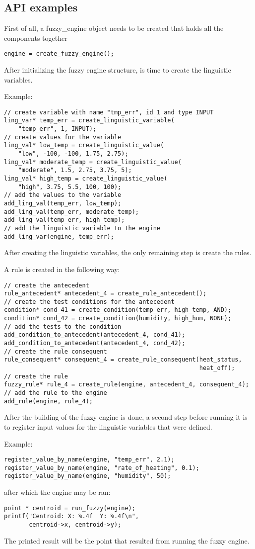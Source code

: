 \subsection{API examples}

\qquad First of all, a fuzzy_engine object needs to be created that holds all the components together
\begin{lstlisting}[frame=single]
engine = create_fuzzy_engine();
\end{lstlisting}

\qquad After initializing the fuzzy engine structure, is time to create the linguistic variables. \par
Example:
\lstset{language=C}
\begin{lstlisting}[frame=single]
// create variable with name "tmp_err", id 1 and type INPUT
ling_var* temp_err = create_linguistic_variable(
    "temp_err", 1, INPUT);
// create values for the variable
ling_val* low_temp = create_linguistic_value(
    "low", -100, -100, 1.75, 2.75);
ling_val* moderate_temp = create_linguistic_value(
    "moderate", 1.5, 2.75, 3.75, 5);
ling_val* high_temp = create_linguistic_value(
    "high", 3.75, 5.5, 100, 100);
// add the values to the variable
add_ling_val(temp_err, low_temp);
add_ling_val(temp_err, moderate_temp);
add_ling_val(temp_err, high_temp);
// add the linguistic variable to the engine
add_ling_var(engine, temp_err);
\end{lstlisting}

\qquad After creating the linguistic variables, the only remaining step is create the rules. \par
A rule is created in the following way:
\begin{lstlisting}[frame=single]
// create the antecedent
rule_antecedent* antecedent_4 = create_rule_antecedent();
// create the test conditions for the antecedent
condition* cond_41 = create_condition(temp_err, high_temp, AND);
condition* cond_42 = create_condition(humidity, high_hum, NONE);
// add the tests to the condition
add_condition_to_antecedent(antecedent_4, cond_41);
add_condition_to_antecedent(antecedent_4, cond_42);
// create the rule consequent
rule_consequent* consequent_4 = create_rule_consequent(heat_status,
                                                       heat_off);
// create the rule
fuzzy_rule* rule_4 = create_rule(engine, antecedent_4, consequent_4);
// add the rule to the engine
add_rule(engine, rule_4);
\end{lstlisting}

\quad After the building of the fuzzy engine is done, a second step before running it is to register input
values for the linguistic variables that were defined. \par
Example:
\begin{lstlisting}[frame=single]
register_value_by_name(engine, "temp_err", 2.1);
register_value_by_name(engine, "rate_of_heating", 0.1);
register_value_by_name(engine, "humidity", 50);
\end{lstlisting}

after which the engine may be ran:
\begin{lstlisting}[frame=single]
point * centroid = run_fuzzy(engine);
printf("Centroid: X: %.4f  Y: %.4f\n",
       centroid->x, centroid->y);
\end{lstlisting}

The printed result will be the point that resulted from running the fuzzy engine.
